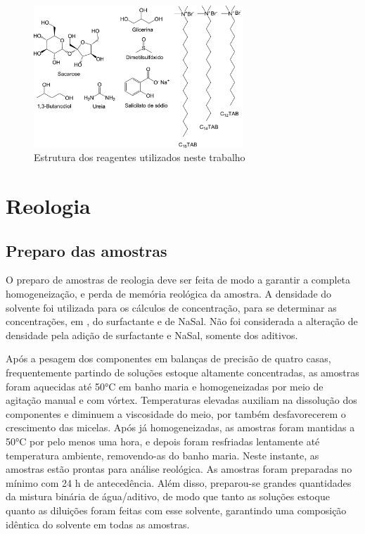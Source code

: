 	\begin{figure}[h]
		\centering
		\includegraphics[width=0.7\textwidth]{imagens/introducao/reagentes}
		\caption{Estrutura dos reagentes utilizados neste trabalho}
		\label{fig:reagentes}
	\end{figure}
	
	\FloatBarrier
	
	\chapter{Reologia}
		\section{Preparo das amostras}
		\label{sec:reologia_preparo_amostra}
		O preparo de amostras de reologia deve ser feita de modo a garantir a completa homogeneização, e perda de memória reológica da amostra. A densidade do solvente foi utilizada para os cálculos de concentração, para se determinar as concentrações, em \mM, do surfactante e de NaSal. Não foi considerada a alteração de densidade pela adição de surfactante e NaSal, somente dos aditivos.
		
		Após a pesagem dos componentes em balanças de precisão de quatro casas, frequentemente partindo de soluções estoque altamente concentradas, as amostras foram aquecidas até 50°C em banho maria e homogeneizadas por meio de agitação manual e com vórtex. Temperaturas elevadas auxiliam na dissolução dos componentes e diminuem a viscosidade do meio, por também desfavorecerem o crescimento das micelas. Após já homogeneizadas, as amostras foram mantidas a 50°C por pelo menos uma hora, e depois foram resfriadas lentamente até temperatura ambiente, removendo-as do banho maria. Neste instante, as amostras estão prontas para análise reológica. As amostras foram preparadas no mínimo com 24 h de antecedência. Além disso, preparou-se grandes quantidades da mistura binária de água/aditivo, de modo que tanto as soluções estoque quanto as diluições foram feitas com esse solvente, garantindo uma composição idêntica do solvente em todas as amostras.
		
